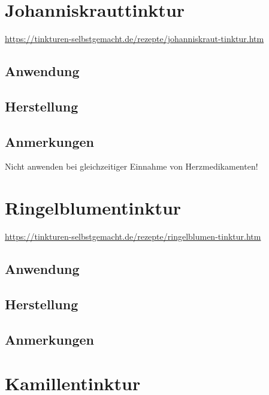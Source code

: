 \section{Johanniskrauttinktur}

\cite{tinkturen} 

\url{https://tinkturen-selbstgemacht.de/rezepte/johanniskraut-tinktur.htm}


\subsection{Anwendung}

\subsection{Herstellung}

\subsection{Anmerkungen}

Nicht anwenden bei gleichzeitiger Einnahme von Herzmedikamenten!





\section{Ringelblumentinktur}

\cite{tinkturen}

\url{https://tinkturen-selbstgemacht.de/rezepte/ringelblumen-tinktur.htm}


\subsection{Anwendung}

\subsection{Herstellung}

\subsection{Anmerkungen}






\section{Kamillentinktur}

